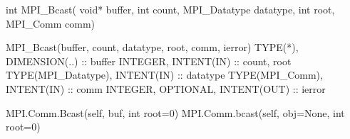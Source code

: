 int MPI_Bcast(
    void* buffer, int count, MPI_Datatype datatype,
    int root, MPI_Comm comm)

MPI_Bcast(buffer, count, datatype, root, comm, ierror)
TYPE(*), DIMENSION(..) :: buffer
INTEGER, INTENT(IN) :: count, root
TYPE(MPI_Datatype), INTENT(IN) :: datatype
TYPE(MPI_Comm), INTENT(IN) :: comm
INTEGER, OPTIONAL, INTENT(OUT) :: ierror

MPI.Comm.Bcast(self, buf, int root=0)
MPI.Comm.bcast(self, obj=None, int root=0)
